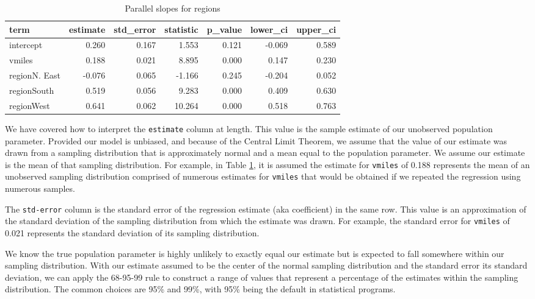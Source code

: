 \documentclass[
]{book}
\begin{document}
\begin{table}

\caption{\label{tab:extable}Parallel slopes for regions}
\centering
\begin{tabular}[t]{l|r|r|r|r|r|r}
\hline
term & estimate & std\_error & statistic & p\_value & lower\_ci & upper\_ci\\
\hline
intercept & 0.260 & 0.167 & 1.553 & 0.121 & -0.069 & 0.589\\
\hline
vmiles & 0.188 & 0.021 & 8.895 & 0.000 & 0.147 & 0.230\\
\hline
regionN. East & -0.076 & 0.065 & -1.166 & 0.245 & -0.204 & 0.052\\
\hline
regionSouth & 0.519 & 0.056 & 9.283 & 0.000 & 0.409 & 0.630\\
\hline
regionWest & 0.641 & 0.062 & 10.264 & 0.000 & 0.518 & 0.763\\
\hline
\end{tabular}
\end{table}

We have covered how to interpret the \texttt{estimate} column at length. This value is the sample estimate of our unobserved population parameter. Provided our model is unbiased, and because of the Central Limit Theorem, we assume that the value of our estimate was drawn from a sampling distribution that is approximately normal and a mean equal to the population parameter. We assume our estimate is the mean of that sampling distribution. For example, in Table \ref{tab:extable}, it is assumed the estimate for \texttt{vmiles} of 0.188 represents the mean of an unobserved sampling distribution comprised of numerous estimates for \texttt{vmiles} that would be obtained if we repeated the regression using numerous samples.

The \texttt{std-error} column is the standard error of the regression estimate (aka coefficient) in the same row. This value is an approximation of the standard deviation of the sampling distribution from which the estimate was drawn. For example, the standard error for \texttt{vmiles} of 0.021 represents the standard deviation of its sampling distribution.

We know the true population parameter is highly unlikely to exactly equal our estimate but is expected to fall somewhere within our sampling distribution. With our estimate assumed to be the center of the normal sampling distribution and the standard error its standard deviation, we can apply the 68-95-99 rule to construct a range of values that represent a percentage of the estimates within the sampling distribution. The common choices are 95\% and 99\%, with 95\% being the default in statistical programs.
\end{document}
